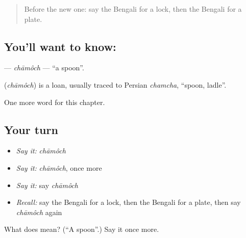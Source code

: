 \begin{quote}
Before the new one: say the Bengali for a lock, then the Bengali for a plate.
\end{quote}

\subsection*{You'll want to know: }
\textbf{} — \emph{chāmôch} — \textquotedblleft{}a spoon\textquotedblright{}.

\begin{cousinweb}
\textbf{} (\emph{chāmôch}) is a loan, usually traced to Persian \emph{chamcha}, \textquotedblleft{}spoon, ladle\textquotedblright{}.
\end{cousinweb}

\begin{grammarlens}[title={What you've built}]
One more word for this chapter.
\end{grammarlens}

\subsection*{Your turn}
\begin{itemize}
\raggedright
  \item \emph{Say it:} \emph{chāmôch}
  \item \emph{Say it:} \emph{chāmôch}, once more
  \item \emph{Say it:} say \emph{chāmôch}
  \item \emph{Recall:} say the Bengali for a lock, then the Bengali for a plate, then say \emph{chāmôch} again
\end{itemize}

\begin{tcolorbox}[breakable,colback=teal!4,colframe=teal!35!black,title={Before you move on}]
What does  mean? (\textquotedblleft{}A spoon\textquotedblright{}.) Say it once more.
\end{tcolorbox}
